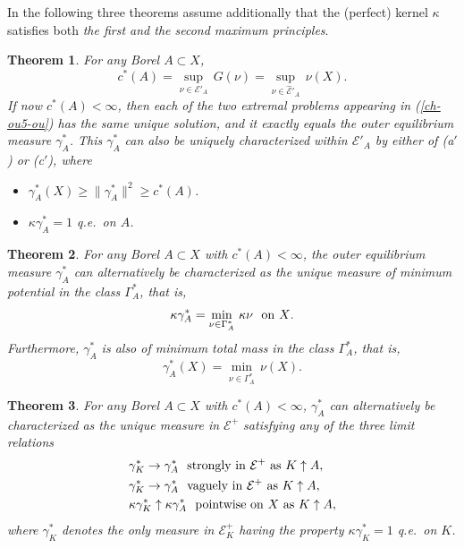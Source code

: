 \documentclass[12pt,a4paper,reqno]{amsart} %
\theoremstyle{lause}
\theoremstyle{maaritelma}
\theoremstyle{lause}
\newtheorem{theorem}{Theorem}[section]
\theoremstyle{maaritelma}
\numberwithin{equation}{section}
\begin{document}
In the following three theorems assume additionally that the (perfect) kernel $\kappa$ satisfies both {\it the first and the second maximum principles}.

\begin{theorem}\label{char-ou1} For any Borel\/ $A\subset X$,
\begin{equation}
c^*(A)=\sup_{\nu\in\mathcal E'_A}\,G(\nu)=\sup_{\nu\in\widehat{\mathcal E}'_A}\,\nu(X).\label{ch-ou5-ou}
\end{equation}
If now\/ $c^*(A)<\infty$, then each of the two extremal problems appearing in\/ {\rm(\ref{ch-ou5-ou})} has the same unique solution, and it exactly equals the outer equilibrium measure\/ $\gamma_A^*$. This\/ $\gamma_A^*$ can also be uniquely characterized within\/ $\mathcal E'_A$ by either of\/ {\rm(a$'$)} or\/ {\rm(c$'$)}, where
\begin{itemize}
\item[{\rm(a$'$)}] $\gamma_A^*(X)\geqslant\|\gamma_A^*\|^2\geqslant c^*(A)$.
\item[{\rm(c$'$)}] $\kappa\gamma^*_A=1$ q.e.\ on\/ $A$.
\end{itemize}
\end{theorem}

\begin{theorem}\label{th-char-ou} For any Borel\/ $A\subset X$ with\/ $c^*(A)<\infty$,
the outer equilibrium measure\/ $\gamma^*_A$ can alternatively be characterized as the unique measure of minimum potential in the class\/ $\Gamma^*_A$, that is,
\[\kappa\gamma^*_A=\min_{\nu\in\Gamma_A^*}\,\kappa\nu\text{ \ on\/ $X$.}\]
Furthermore, $\gamma^*_A$ is also of minimum total mass in the class\/ $\Gamma^*_A$, that is,
\[\gamma_A^*(X)=\min_{\nu\in\Gamma_A^*}\,\nu(X).\]
\end{theorem}

\begin{theorem}\label{cor2alt-ou}For any Borel\/ $A\subset X$ with\/ $c^*(A)<\infty$, $\gamma^*_A$ can alternatively be characterized as the unique measure in\/ $\mathcal E^+$ satisfying any of the three limit relations
\begin{align*}&\gamma_K^*\to\gamma^*_A\text{ \ strongly in\/ $\mathcal E^+$ as\/ $K\uparrow A$},\\
&\gamma_K^*\to\gamma^*_A\text{ \ vaguely in\/ $\mathcal E^+$ as\/ $K\uparrow A$},\\
&\kappa\gamma_K^*\uparrow\kappa\gamma^*_A\text{ \ pointwise on\/ $X$  as\/ $K\uparrow A$},
\end{align*}
where\/ $\gamma_K^*$ denotes the only measure in\/ $\mathcal E^+_K$ having the property\/ $\kappa\gamma_K^*=1$ q.e.\ on\/ $K$.\end{theorem}
\end{document}
